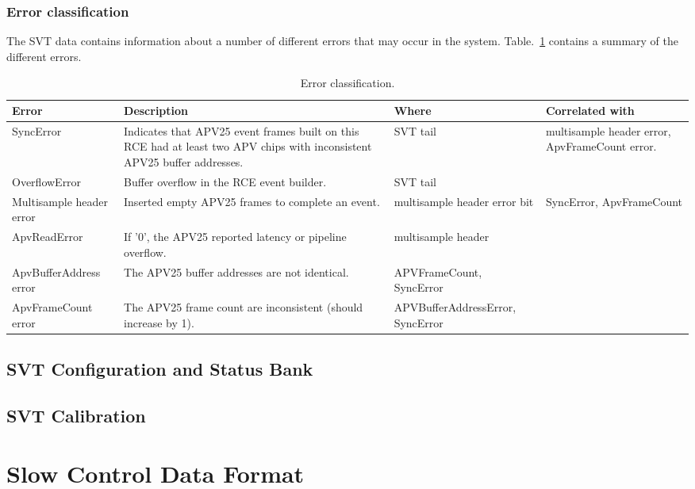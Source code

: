 \documentclass{desyproc}
\begin{document}
\subsubsection{Error classification}
The SVT data contains information about a number of different errors that may occur in the system. Table.~\ref{tab:errors} contains a summary 
of the different errors.
\begin{table}[]
  \begin{center}
    \caption{Error classification.}
    \label{tab:errors}
    \begin{tabular}{p{2cm}p{6cm}p{2cm}p{2cm}}
   	\hline
    	\bf Error & \bf Description & \bf Where & \bf Correlated with\\
	\hline
    	SyncError & Indicates that APV25 event frames built on this RCE had at least two APV chips with inconsistent APV25 buffer addresses.  & SVT tail & multisample header error, ApvFrameCount error. \\
	\hline
	OverflowError & Buffer overflow in the RCE event builder. & SVT tail & \\ 
	\hline
	Multisample header error & Inserted empty APV25 frames to complete an event. & multisample header error bit & SyncError, ApvFrameCount\\ 
	\hline
	ApvReadError & If '0', the APV25 reported latency or pipeline overflow. & multisample header  & \\ 
	\hline
	ApvBufferAddress error & The APV25 buffer addresses are not identical. & APVFrameCount, SyncError  & \\ 
	\hline
	ApvFrameCount error & The APV25 frame count are inconsistent (should increase by 1). & APVBufferAddressError, SyncError  & \\ 	
	\hline
      \end{tabular}
  \end{center}
\end{table}


\subsection{SVT Configuration and Status Bank}

\subsection{SVT Calibration}




\section{Slow Control Data Format}
\end{document}
